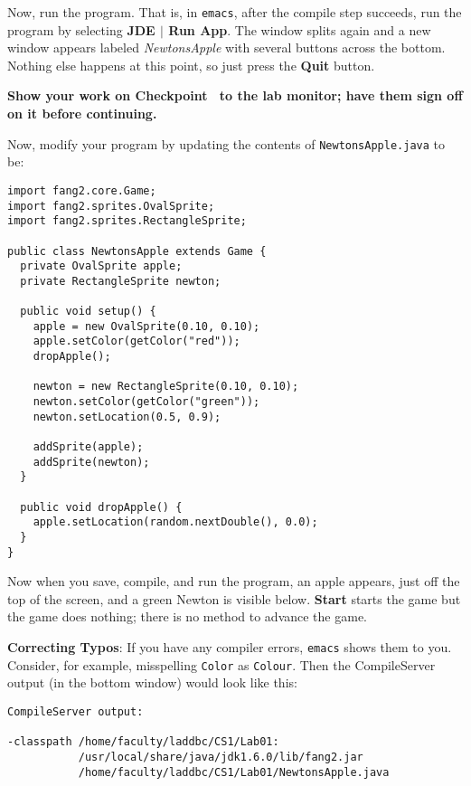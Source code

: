 \documentclass[12pt,twoside]{memoir}
\begin{document}
\begin{Exercise}[name={Checkpoint},title={Run the program}]
  Now, run the program. That is, in \texttt{emacs}, after the compile
  step succeeds, run the program by selecting \textbf{JDE $|$ Run
    App}. The window splits again and a new window appears labeled
  \emph{NewtonsApple} with several buttons across the bottom. Nothing
  else happens at this point, so just press the \textbf{Quit} button.
\end{Exercise}
\noindent
\textbf{Show your work on Checkpoint~\theExercise{} to the lab monitor;
  have them sign off on it before continuing.}
\newpage
\begin{Exercise}[name={Checkpoint},title={Continue the program.}]
Now, modify your program by updating the contents of
\texttt{NewtonsApple.java} to be: 

\begin{lstlisting}
import fang2.core.Game;
import fang2.sprites.OvalSprite;
import fang2.sprites.RectangleSprite;

public class NewtonsApple extends Game {
  private OvalSprite apple;
  private RectangleSprite newton;

  public void setup() {
    apple = new OvalSprite(0.10, 0.10);
    apple.setColor(getColor("red"));
    dropApple();

    newton = new RectangleSprite(0.10, 0.10);
    newton.setColor(getColor("green"));
    newton.setLocation(0.5, 0.9);

    addSprite(apple);
    addSprite(newton);
  }

  public void dropApple() {
    apple.setLocation(random.nextDouble(), 0.0);
  }
}  
\end{lstlisting}

Now when you save, compile, and run the program, an apple appears,
just off the top of the screen, and a green Newton is visible below.
\textbf{Start} starts the game but the game does nothing; there is no
method to advance the game.

\textbf{Correcting Typos}: If you have any compiler errors,
\texttt{emacs} shows them to you. Consider, for example, misspelling
\texttt{Color} as \texttt{Colour}. Then the CompileServer  output (in the
bottom window) would look like this:

\begin{lstlisting}[numbers=none]
CompileServer output:

-classpath /home/faculty/laddbc/CS1/Lab01:
           /usr/local/share/java/jdk1.6.0/lib/fang2.jar 
           /home/faculty/laddbc/CS1/Lab01/NewtonsApple.java


\end{lstlisting}
\end{Exercise}
\end{document}
